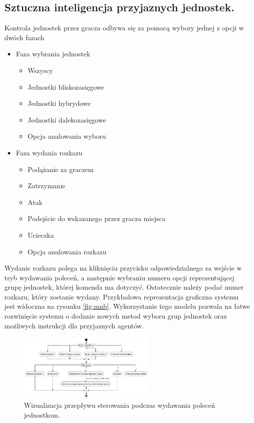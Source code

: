 \subsection{Sztuczna inteligencja przyjaznych jednostek.}

Kontrola jednostek przez gracza odbywa się za pomocą wybory jednej z opcji w dwóch fazach
\begin{itemize}
\item Faza wybrania jednostek
  \begin{itemize}
    \item Wszyscy
    \item Jednostki bliskozasięgowe 
    \item Jednostki hybrydowe
    \item Jednostki dalekozasięgowe
    \item Opcja anulowania wyboru
  \end{itemize}

\item Faza wydania rozkazu
  \begin{itemize}
    \item Podążanie za graczem
    \item Zatrzymanie
    \item Atak
    \item Podejście do wskazanego przez gracza miejsca
    \item Ucieczka
      \item Opcja anulowania rozkazu
  \end{itemize}
\end{itemize}

Wydanie rozkazu polega na kliknięciu przycisku odpowiedzialnego za wejście w tryb wydawania poleceń, a następnie
wybraniu numeru opcji reprezentującej grupę jednostek, której komenda ma dotyczyć. Ostatecznie należy podać numer rozkazu, który zostanie wydany.
Przykładowa reprezentacja graficzna systemu jest widoczna na rysunku \ref{fig:mnb}.
Wykorzystanie tego modelu pozwala na łatwe rozwinięcie systemu o dodanie nowych metod wyboru grup jednostek oraz możliwych instrukcji dla przyjaznych agentów.

\begin{figure}[h]
\centering
\includegraphics[width=0.6\textwidth]{uml/commands}
\caption{Wizualizacja przepływu sterowania podczas wydawania poleceń jednostkom.}
\end{figure}
